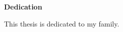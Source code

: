 \cleardoublepage


\begin{center}\textbf{Dedication}\end{center}

This thesis is dedicated to my family.
\cleardoublepage

\renewcommand\contentsname{Table of Contents}
\tableofcontents
\cleardoublepage
{}    %

\listoftables
\cleardoublepage
{}		%

\listoffigures
\cleardoublepage
{}		%

\lstlistoflistings
\cleardoublepage
{}		%

\cleardoublepage
{}		%


